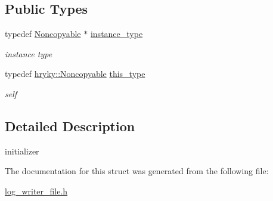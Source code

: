 \subsection*{Public Types}
\begin{DoxyCompactItemize}
\item 
\hypertarget{classhryky_1_1_noncopyable_aaf87abb55f700af85ecb0895f6178821}{typedef \hyperlink{classhryky_1_1_noncopyable}{Noncopyable} $\ast$ \hyperlink{classhryky_1_1_noncopyable_aaf87abb55f700af85ecb0895f6178821}{instance\-\_\-type}}\label{classhryky_1_1_noncopyable_aaf87abb55f700af85ecb0895f6178821}

\begin{DoxyCompactList}\small\item\em instance type \end{DoxyCompactList}\item 
\hypertarget{classhryky_1_1_noncopyable_acf13ad1c98a76247a561dff514979da5}{typedef \hyperlink{classhryky_1_1_noncopyable}{hryky\-::\-Noncopyable} \hyperlink{classhryky_1_1_noncopyable_acf13ad1c98a76247a561dff514979da5}{this\-\_\-type}}\label{classhryky_1_1_noncopyable_acf13ad1c98a76247a561dff514979da5}

\begin{DoxyCompactList}\small\item\em self \end{DoxyCompactList}\end{DoxyCompactItemize}


\subsection{Detailed Description}
initializer 

The documentation for this struct was generated from the following file\-:\begin{DoxyCompactItemize}
\item 
\hyperlink{log__writer__file_8h}{log\-\_\-writer\-\_\-file.\-h}\end{DoxyCompactItemize}
